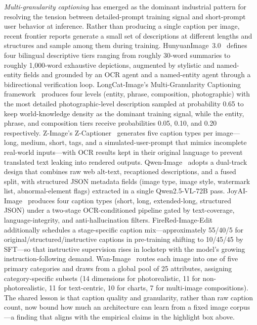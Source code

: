 \documentclass{llmxive}
\begin{document}
\emph{Multi-granularity captioning} has emerged as the dominant industrial pattern for resolving the tension between detailed-prompt training signal and short-prompt user behavior at inference. Rather than producing a single caption per image, recent frontier reports generate a small set of descriptions at different lengths and structures and sample among them during training. HunyuanImage~3.0~\citep{cao2025hunyuanimage} defines four bilingual descriptive tiers ranging from roughly 30-word summaries to roughly 1{,}000-word exhaustive depictions, augmented by stylistic and named-entity fields and grounded by an OCR agent and a named-entity agent through a bidirectional verification loop. LongCat-Image's Multi-Granularity Captioning framework~\citep{team2025longcat} produces four levels (entity, phrase, composition, photographic) with the most detailed photographic-level description sampled at probability 0.65 to keep world-knowledge density as the dominant training signal, while the entity, phrase, and composition tiers receive probabilities 0.05, 0.10, and 0.20 respectively. Z-Image's Z-Captioner~\citep{cai2025z} generates five caption types per image---long, medium, short, tags, and a simulated-user-prompt that mimics incomplete real-world inputs---with OCR results kept in their original language to prevent translated text leaking into rendered outputs. Qwen-Image~\citep{wu2025qwen} adopts a dual-track design that combines raw web alt-text, recaptioned descriptions, and a fused split, with structured JSON metadata fields (image type, image style, watermark list, abnormal-element flags) extracted in a single Qwen2.5-VL-72B pass. JoyAI-Image~\citep{jdjoyaiimage} produces four caption types (short, long, extended-long, structured JSON) under a two-stage OCR-conditioned pipeline gated by text-coverage, language-integrity, and anti-hallucination filters. FireRed-Image-Edit~\citep{team2026firered} additionally schedules a stage-specific caption mix---approximately 55/40/5 for original/structured/instructive captions in pre-training shifting to 10/45/45 by SFT---so that instructive supervision rises in lockstep with the model's growing instruction-following demand. Wan-Image~\citep{mao2026wan} routes each image into one of five primary categories and draws from a global pool of 25 attributes, assigning category-specific subsets (14 dimensions for photorealistic, 11 for non-photorealistic, 11 for text-centric, 10 for charts, 7 for multi-image compositions). The shared lesson is that caption quality and granularity, rather than raw caption count, now bound how much an architecture can learn from a fixed image corpus---a finding that aligns with the empirical claims in the highlight box above.
\end{document}
